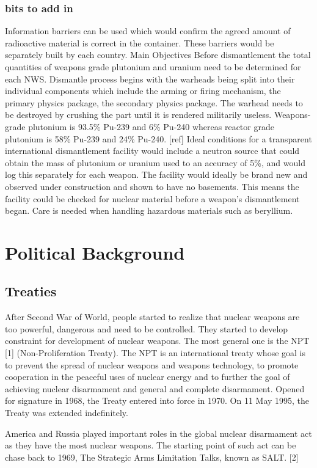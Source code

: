 \documentclass[twoside,titlepage,11pt,twocolumn,a4paper]{article}
\begin{document}
\subsubsection{bits to add in}
Information barriers can be used which would confirm the agreed amount
of radioactive material is correct in the container. These barriers
would be separately built by each country.  Main Objectives Before
dismantlement the total quantities of weapons grade plutonium and
uranium need to be determined for each NWS.  Dismantle process begins
with the warheads being split into their individual components which
include the arming or firing mechanism, the primary physics package,
the secondary physics package.  The warhead needs to be destroyed by
crushing the part until it is rendered militarily useless.
Weapons-grade plutonium is 93.5\% Pu-239 and 6\% Pu-240 whereas
reactor grade plutonium is 58\% Pu-239 and 24\% Pu-240. [ref] Ideal
conditions for a transparent international dismantlement facility
would include a neutron source that could obtain the mass of plutonium
or uranium used to an accuracy of 5\%, and would log this separately
for each weapon.  The facility would ideally be brand new and observed
under construction and shown to have no basements. This means the
facility could be checked for nuclear material before a weapon’s
dismantlement began.  Care is needed when handling hazardous materials
such as beryllium.

\section{Political Background}
\subsection{Treaties}
After Second War of World, people started to realize that nuclear 
weapons are too powerful, dangerous and need to be controlled. They
started to develop constraint for development of nuclear weapons. 
The most general one is the NPT [1] (Non-Proliferation Treaty). The
NPT is an international treaty whose goal is to prevent the spread 
of nuclear weapons and weapons technology, to promote cooperation 
in the peaceful uses of nuclear energy and to further the goal of 
achieving nuclear disarmament and general and complete disarmament. 
Opened for signature in 1968, the Treaty entered into force in 1970. 
On 11 May 1995, the Treaty was extended indefinitely.

America and Russia played important roles in the global nuclear 
disarmament act as they have the most nuclear weapons. The starting 
point of such act can be chase back to 1969, The Strategic Arms 
Limitation Talks, known as SALT. [2]
\end{document}
